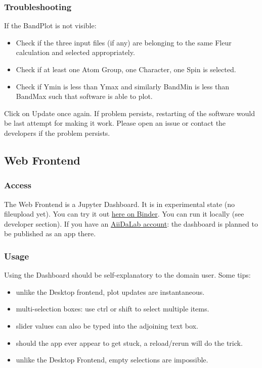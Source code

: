 \subsubsection{Troubleshooting}\label{troubleshooting}

If the BandPlot is not visible:

\begin{itemize}
\tightlist
\item
  Check if the three input files (if any) are belonging to the same
  Fleur calculation and selected appropriately.
\item
  Check if at least one Atom Group, one Character, one Spin is selected.
\item
  Check if Ymin is less than Ymax and similarly BandMin is less than
  BandMax such that software is able to plot.
\end{itemize}

Click on Update once again. If problem persists, restarting of the
software would be last attempt for making it work. Please open an issue
or contact the developers if the problem persists.

\subsection{Web Frontend}\label{web-frontend}

\subsubsection{Access}\label{access}

The Web Frontend is a Jupyter Dashboard. It is in experimental state (no
fileupload yet). You can try it out
\href{https://mybinder.org/v2/gh/JuDFTteam/masci-tools/studentproject18ws?filepath=studentproject18w\%2Ffrontend\%2Fjupyter\%2Fdemo\%2Fbinder_demo.ipynb}{here
  on Binder}. You can run it locally (see developer section). If you have an
\href{https://aiidalab.materialscloud.org/hub/login}{AiiDaLab account}: the
dashboard is planned to be published as an app there.

\subsubsection{Usage}\label{usage-1}

Using the Dashboard should be self-explanatory to the domain user. Some
tips:

\begin{itemize}
\tightlist
\item
  unlike the Desktop frontend, plot updates are instantaneous.
\item
  multi-selection boxes: use ctrl or shift to select multiple items.
\item
  slider values can also be typed into the adjoining text box.
\item
  should the app ever appear to get stuck, a reload/rerun will do the
  trick.
\item
  unlike the Desktop Frontend, empty selections are impossible.
\end{itemize}

